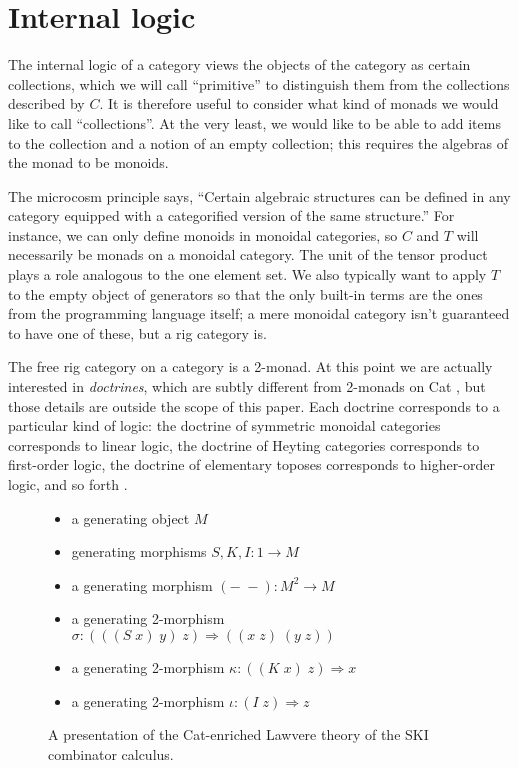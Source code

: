 \documentclass[sigplan,9pt,review,anonymous]{acmart}\settopmatter{printfolios=true,printccs=false,printacmref=false}
\newcommand{\maps}{\colon}
\begin{document}
\section{Internal logic}

The internal logic of a category views the objects of the category as certain collections, which we will call ``primitive'' to distinguish them from the collections described by $C.$  It is therefore useful to consider what kind of monads we would like to call ``collections''.  At the very least, we would like to be able to add items to the collection and a notion of an empty collection; this requires the algebras of the monad to be monoids.

The microcosm principle \cite{BaezDolan} says, ``Certain algebraic structures can be defined in any category equipped with a categorified version of the same structure.''  For instance, we can only define monoids in monoidal categories, so $C$ and $T$ will necessarily be monads on a monoidal category.  The unit of the tensor product plays a role analogous to the one element set.  We also typically want to apply $T$ to the empty object of generators so that the only built-in terms are the ones from the programming language itself; a mere monoidal category isn't guaranteed to have one of these, but a rig category is.

The free rig category on a category is a 2-monad.  At this point we are actually interested in {\em doctrines}, which are subtly different from 2-monads on Cat \cite{nlabDoctrine}, but those details are outside the scope of this paper.  Each doctrine corresponds to a particular kind of logic: the doctrine of symmetric monoidal categories corresponds to linear logic, the doctrine of Heyting categories corresponds to first-order logic, the doctrine of elementary toposes corresponds to higher-order logic, and so forth \cite{nlabInternalLogicKindsOfInternalLogic}.



\begin{figure}
  \begin{center}
    \begin{itemize}
      \item a generating object $M$
      \item generating morphisms $S,K,I\maps 1\to M$
      \item a generating morphism $(-\;-)\maps M^2 \to M$
      \item a generating 2-morphism $\sigma\maps (((S\;x)\;y)\;z)\Rightarrow ((x\;z)\;(y\;z))$
      \item a generating 2-morphism $\kappa\maps ((K\;x)\;z)\Rightarrow x$
      \item a generating 2-morphism $\iota\maps (I\;z)\Rightarrow z$
    \end{itemize}
  \end{center}
  \caption{A presentation of the Cat-enriched Lawvere theory of the SKI combinator calculus.}
  \label{fig:SKI}
\end{figure}
\end{document}
